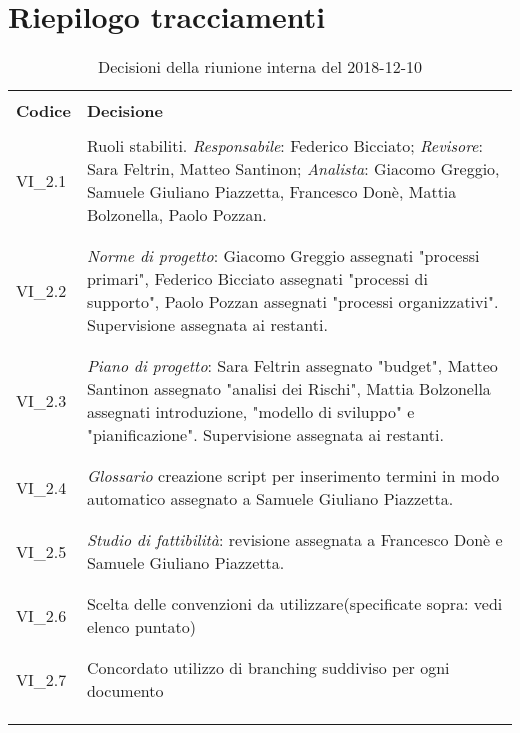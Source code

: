 \section{Riepilogo tracciamenti}
\begin{centering}
\begin{longtable}{ >{\centering}p{4cm} >{\centering}p{11cm} }

\hline
\\[0.5pt]
	\textbf{Codice} & \textbf{Decisione} 
	
	\tabularnewline 
	\hline
	
	
				\\[0.5pt]
				VI\_2.1 & Ruoli stabiliti. \textit{Responsabile}: Federico Bicciato; \textit{Revisore}: Sara Feltrin, Matteo Santinon; \textit{Analista}: Giacomo Greggio, Samuele Giuliano Piazzetta, Francesco Donè, Mattia Bolzonella, Paolo Pozzan.
				\\[0.5pt]
				\tabularnewline
				\hline
						
				\\[0.5pt]
				VI\_2.2 & \textit{Norme di progetto}: Giacomo Greggio assegnati "processi primari", Federico Bicciato assegnati "processi di supporto", Paolo Pozzan assegnati "processi organizzativi". Supervisione assegnata ai restanti.
				\\[0.5pt]
				\tabularnewline
				\hline
				
				\\[0.5pt]
				VI\_2.3 & \textit{Piano di progetto}: Sara Feltrin assegnato "budget", Matteo Santinon assegnato "analisi dei Rischi", Mattia Bolzonella assegnati introduzione, "modello di sviluppo" e "pianificazione".
				Supervisione assegnata ai restanti.
				\\[0.5pt]
				\tabularnewline
				\hline
				
				\\[0.5pt]				
				VI\_2.4 & \textit{Glossario} creazione script per inserimento termini in modo automatico assegnato a Samuele Giuliano Piazzetta.
				\\[0.5pt]
				\tabularnewline
				\hline
				
				\\[0.5pt]
				VI\_2.5 & \textit{Studio di fattibilità}: revisione assegnata a Francesco Donè e Samuele Giuliano Piazzetta.
				\\[0.5pt]
				\tabularnewline
				\hline
				
				\\[0.5pt]
				VI\_2.6 & Scelta delle convenzioni da utilizzare(specificate sopra: vedi elenco puntato)
				\\[0.5pt]
				\tabularnewline
				\hline
		
				\\[0.5pt]
				VI\_2.7 & Concordato utilizzo di branching suddiviso per ogni documento
				\\[0.5pt]
				\tabularnewline
				\hline          	
                
        \\[0.7pt]
        \caption{Decisioni della riunione interna del 2018-12-10}
\end{longtable}
\end{centering}

